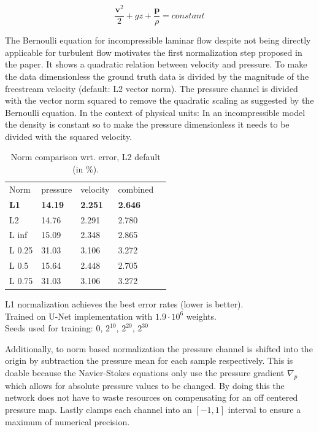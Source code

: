 \documentclass[acmtog]{techreportacmart}
\begin{document}
\begin{equation}
\label{eqn:00}
	\frac{\textbf{v}^2}{2} + gz + \frac{\textbf{p}}{\rho} = constant
\end{equation}

The Bernoulli equation for incompressible laminar flow despite not being directly applicable for turbulent flow
motivates the first normalization step proposed in the paper. It shows a quadratic relation between velocity and
pressure. To make the data dimensionless the ground truth data is divided by the magnitude of the freestream 
velocity (default: L2 vector norm). The pressure channel is divided with the vector norm squared to remove the 
quadratic scaling as suggested by the Bernoulli equation.
In the context of physical units: In an incompressible model the density is constant so to make the 
pressure dimensionless it needs to be divided with the squared velocity. \\
\begin{table}
\caption{Norm comparison wrt. error, L2 default (in \%).}
\label{tab:one}
\begin{center}
\begin{tabular}{l|l|l|l|l}
  \toprule
  Norm   & pressure   &	velocity    & combined \\
  \bf L1	 & \bf 14.19	  & \bf 2.251		& \bf 2.646    \\
  L2	 & 14.76	  & 2.291		& 2.780	   \\
  L inf	 & 15.09	  & 2.348		& 2.865	   \\
  L 0.25 & 31.03	  & 3.106		& 3.272	   \\
  L 0.5  & 15.64	  & 2.448		& 2.705	   \\
  L 0.75 & 31.03	  & 3.106		& 3.272	   \\	
  \bottomrule
\end{tabular}
\end{center}
\bigskip\centering
\footnotesize L1 normalization achieves the best error rates (lower is better). \\
Trained on \cite{Thuerey20} U-Net implementation with $1.9 \cdot 10^{6}$ weights. \\
Seeds used for training: $0$, $2^{10}$, $2^{20}$, $2^{30}$
\end{table}%
Additionally, to norm based normalization the pressure channel is shifted into the origin 
by subtraction the pressure mean for each sample respectively. This is doable because the 
Navier-Stokes equations only use the pressure gradient $\nabla_p$ which allows for absolute pressure
values to be changed. By doing this the network does not have to waste resources on 
compensating for an off centered pressure map. Lastly \cite{Thuerey20} clamps each channel 
into an $[-1, 1]$ interval to ensure a maximum of numerical precision.
\end{document}
